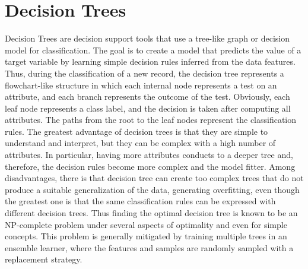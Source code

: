 \documentclass[final,a4paper,12pt,english]{UnicaPhdThesis3}
\begin{document}
\section{Decision Trees} \label{DT}
Decision Trees \cite{Quinlan} are decision support tools that use a tree-like graph or decision model for classification. The goal is to create a model that predicts the value of a target variable by learning simple decision rules inferred from the data features. Thus, during the classification of a new record, the decision tree represents a flowchart-like structure in which each internal node represents a test on an attribute, and each branch represents the outcome of the test. Obviously, each leaf node represents a class label, and the decision is taken after computing all attributes. The paths from the root to the leaf nodes represent the classification rules. The greatest advantage of decision trees is that they are simple to understand and interpret, but they can be complex with a high number of attributes. In particular, having more attributes conducts to a deeper tree and, therefore, the decision rules become more complex and the model fitter.
Among disadvantages, there is that decision tree can create too complex trees that do not produce a suitable generalization of the data, generating overfitting, even though the greatest one is that the same classification rules can be expressed with different decision trees. Thus finding the optimal decision tree is known to be an NP-complete problem under several aspects of optimality and even for simple concepts. This problem is generally mitigated by training multiple trees in an ensemble learner, where the features and samples are randomly sampled with a replacement strategy.
\end{document}
